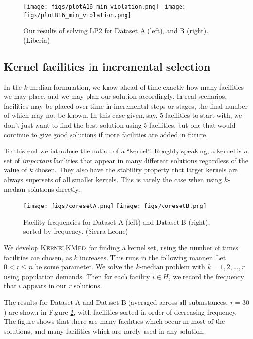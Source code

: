 \begin{figure}[h]
  \centering %
    \texttt{[image: figs/plotA16\_min\_violation.png]}
	\texttt{[image: figs/plotB16\_min\_violation.png]}
\caption{Our results of solving LP2 for Dataset A (left), and B (right). (Liberia)} 
	\label{fig:LP2_AB}
\end{figure}



\subsection*{Kernel facilities in incremental selection}

In the $k$-median formulation, we know ahead of time exactly how many facilities we may place, and we may plan our solution accordingly. In real scenarios, facilities may be placed over time in incremental steps or stages, the final number of which may not be known. In this case given, say, 5 facilities to start with, we don't just want to find the best solution using 5 facilities, but one that would continue to give good solutions if more facilities are added in future.


To this end we introduce the notion of a ``kernel''. 
Roughly speaking, a kernel is a set of \textit{important} facilities that appear in many different solutions regardless of the value of $k$ chosen. They also have the stability property that larger kernels are always supersets of all smaller kernels. This is rarely the case when using $k$-median solutions directly.

\begin{figure}[h]
  \centering %
    \texttt{[image: figs/coresetA.png]}
        \texttt{[image: figs/coresetB.png]}
\caption{Facility frequencies for Dataset A (left) and Dataset B (right), sorted by frequency. (Sierra Leone)}
        \label{fig:coreset_A_and_B}
\end{figure}

We develop $\textsc{KernelKMed}$ for finding a kernel set, using the number of times facilities are chosen, as $k$ increases. This runs in the following manner.
Let $0 < r \leq n$ be some parameter. We solve the $k$-median problem with $k = 1, 2, \ldots, r$ using population demands. Then for each facility $i \in H$, we record the frequency that $i$ appears in our $r$ solutions.

The results for Dataset A and Dataset B (averaged across all subinstances, $r = 30$) are shown in Figure \ref{fig:coreset_A_and_B}, with facilities sorted in order of decreasing frequency. The figure shows that there are many facilities which occur in most of the solutions, and many facilities which are rarely used in any solution. 

